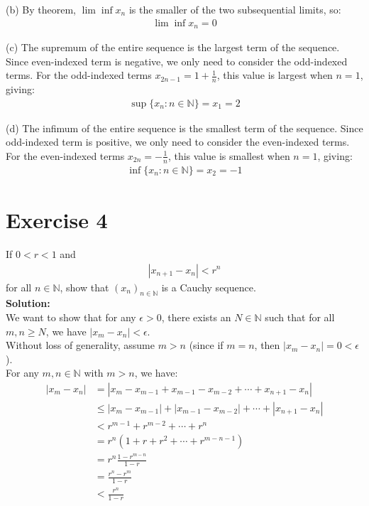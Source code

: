 \documentclass{article}
\begin{document}
(b) By theorem, $\lim \inf x_n$ is the smaller of the two subsequential limits, so:
\begin{align*}
\lim \inf x_n = 0
\end{align*}

(c) The supremum of the entire sequence is the largest term of the sequence. Since even-indexed term is negative, we only need to consider the odd-indexed terms. For the odd-indexed terms $x_{2n-1} = 1+\frac{1}{n}$, this value is largest when $n=1$, giving:
\begin{align*}
\sup\{x_n : n \in \mathbb{N}\} = x_1 = 2
\end{align*}

(d) The infimum of the entire sequence is the smallest term of the sequence. Since odd-indexed term is positive, we only need to consider the even-indexed terms. For the even-indexed terms $x_{2n} = -\frac{1}{n}$, this value is smallest when $n=1$, giving:
\begin{align*}
\inf\{x_n : n \in \mathbb{N}\} = x_2 = -1
\end{align*}

\newpage

\section*{Exercise 4}
If $0 < r < 1$ and
\begin{align*}
|x_{n+1} - x_n| < r^n
\end{align*}
for all $n \in \mathbb{N}$, show that $(x_n)_{n \in \mathbb{N}}$ is a Cauchy sequence. \\

\textbf{Solution: }\\

We want to show that for any $\epsilon > 0$, there exists an $N \in \mathbb{N}$ such that for all $m, n \geq N$, we have $|x_m - x_n| < \epsilon$. \\

Without loss of generality, assume $m > n$ (since if $m = n$, then $|x_m - x_n| = 0 < \epsilon$). \\

For any $m, n \in \mathbb{N}$ with $m > n$, we have:
\begin{align*}
|x_m - x_n| &= |x_m - x_{m-1} + x_{m-1} - x_{m-2} + \cdots + x_{n+1} - x_n| \\
&\leq |x_m - x_{m-1}| + |x_{m-1} - x_{m-2}| + \cdots + |x_{n+1} - x_n| \\
&< r^{m-1} + r^{m-2} + \cdots + r^n \\
&= r^n(1 + r + r^2 + \cdots + r^{m-n-1}) \\
&= r^n \frac{1 - r^{m-n}}{1 - r} \\
&= \frac{r^n - r^m}{1 - r} \\
&< \frac{r^n}{1 - r}
\end{align*}
\end{document}
